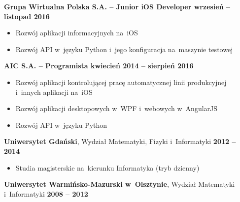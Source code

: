 \documentclass[11pt,a4paper]{article}
\newcommand*\header[1]{
    \noindent\raisebox{.1cm}{\color{MidnightBlue}\rule{1.5cm}{.1cm}\hspace{.2cm}\raisebox{-.1cm}{\large\bf #1}}}
\begin{document}
    {\bf Grupa Wirtualna Polska S.A. -- Junior iOS Developer \hfill wrzesień -- listopad 2016}

    \vspace{-.23cm}
    \begin{itemize}[leftmargin=1.5cm] \itemsep.2mm \parskip0mm 
        \item Rozwój aplikacji informacyjnych na~iOS
        \item Rozwój API w~języku Python i~jego konfiguracja na~maszynie testowej
    \end{itemize}

    \vspace{-.17cm}

    {\bf AIC S.A. -- Programista \hfill kwiecień 2014 -- sierpień 2016}

    \vspace{-.23cm}
    \begin{itemize}[leftmargin=1.5cm] \itemsep.2mm \parskip0mm 
        \item Rozwój aplikacji kontrolującej pracę automatycznej linii produkcyjnej i~innych aplikacji na~iOS
        \item Rozwój aplikacji desktopowych w~WPF i~webowych w~AngularJS
        \item Rozwój API w~języku Python
    \end{itemize}


    \medskip
  
    \header{Edukacja}
  
    \smallskip

    {{\bf Uniwersytet Gdański}, Wydział Matematyki, Fizyki i~Informatyki \hfill {\bf 2012 -- 2014}}

    \vspace{-.23cm}
    \begin{itemize}[leftmargin=1.5cm] \itemsep.2mm \parskip0mm 
        \item[ ] Studia magisterskie na~kierunku Informatyka (tryb dzienny)
    \end{itemize}

    \vspace{-.17cm}

    {{\bf Uniwersytet Warmińsko-Mazurski w~Olsztynie}, Wydział Matematyki i~Informatyki
        \hfill {\bf 2008 -- 2012}}
\end{document}
